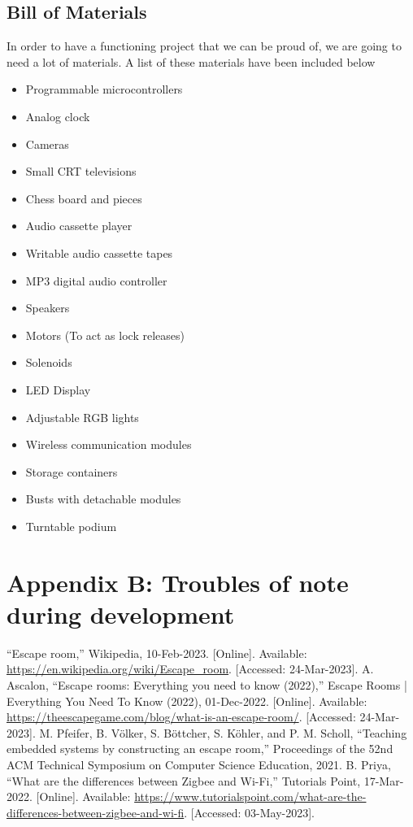 \documentclass[conference]{IEEEtran}
\begin{document}
\subsection{Bill of Materials}
In order to have a functioning project that we can be proud of, we are going to need a lot of materials.
A list of these materials have been included below
\begin{itemize}
    \item Programmable microcontrollers
    \item Analog clock
    \item Cameras
    \item Small CRT televisions
    \item Chess board and pieces
    \item Audio cassette player
    \item Writable audio cassette tapes
    \item MP3 digital audio controller
    \item Speakers
    \item Motors (To act as lock releases)
    \item Solenoids
    \item LED Display
    \item Adjustable RGB lights
    \item Wireless communication modules
    \item Storage containers
    \item Busts with detachable modules
    \item Turntable podium
\end{itemize}

\section{Appendix B: Troubles of note during development}

\begin{thebibliography}{00}

     “Escape room,” Wikipedia, 10-Feb-2023. [Online]. Available: \url{https://en.wikipedia.org/wiki/Escape_room}. [Accessed: 24-Mar-2023].
     A. Ascalon, “Escape rooms: Everything you need to know (2022),” Escape Rooms | Everything You Need To Know (2022), 01-Dec-2022. [Online]. Available:  \url{https://theescapegame.com/blog/what-is-an-escape-room/}. [Accessed: 24-Mar-2023].
     M. Pfeifer, B. Völker, S. Böttcher, S. Köhler, and P. M. Scholl, “Teaching embedded systems by constructing an escape room,” Proceedings of the 52nd ACM Technical Symposium on Computer Science Education, 2021.
     B. Priya, “What are the differences between Zigbee and Wi-Fi,” Tutorials Point, 17-Mar-2022. [Online]. Available: \url{https://www.tutorialspoint.com/what-are-the-differences-between-zigbee-and-wi-fi}. [Accessed: 03-May-2023].

\end{thebibliography}
\end{document}
